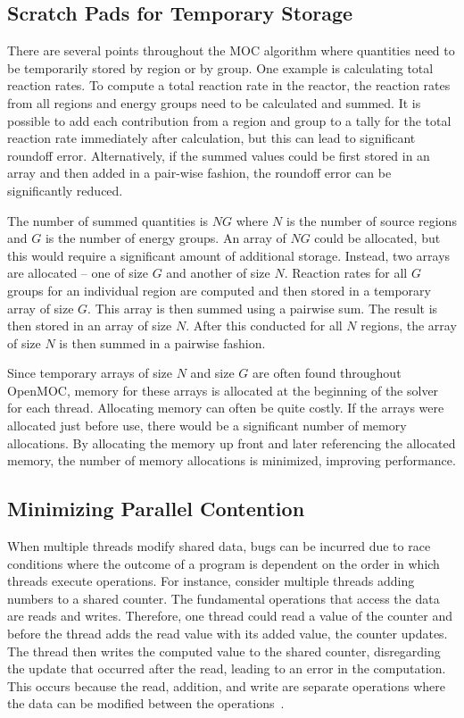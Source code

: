 \subsection{Scratch Pads for Temporary Storage}

There are several points throughout the \ac{MOC} algorithm where quantities need to be temporarily stored by region or by group. One example is calculating total reaction rates. To compute a total reaction rate in the reactor, the reaction rates from all regions and energy groups need to be calculated and summed. It is possible to add each contribution from a region and group to a tally for the total reaction rate immediately after calculation, but this can lead to significant roundoff error. Alternatively, if the summed values could be first stored in an array and then added in a pair-wise fashion, the roundoff error can be significantly reduced.

The number of summed quantities is $NG$ where $N$ is the number of source regions and $G$ is the number of energy groups. An array of $NG$ could be allocated, but this would require a significant amount of additional storage. Instead, two arrays are allocated -- one of size $G$ and another of size $N$. Reaction rates for all $G$ groups for an individual region are computed and then stored in a temporary array of size $G$. This array is then summed using a pairwise sum. The result is then stored in an array of size $N$. After this conducted for all $N$ regions, the array of size $N$ is then summed in a pairwise fashion.

Since temporary arrays of size $N$ and size $G$ are often found throughout OpenMOC, memory for these arrays is allocated at the beginning of the solver for each thread. Allocating memory can often be quite costly. If the arrays were allocated just before use, there would be a significant number of memory allocations. By allocating the memory up front and later referencing the allocated memory, the number of memory allocations is minimized, improving performance.

\subsection{Minimizing Parallel Contention}

When multiple threads modify shared data, bugs can be incurred due to race conditions where the outcome of a program is dependent on the order in which threads execute operations. For instance, consider multiple threads adding numbers to a shared counter. The fundamental operations that access the data are reads and writes. Therefore, one thread could read a value of the counter and before the thread adds the read value with its added value, the counter updates. The thread then writes the computed value to the shared counter, disregarding the update that occurred after the read, leading to an error in the computation. This occurs because the read, addition, and write are separate operations where the data can be modified between the operations~\cite{shavit}.

